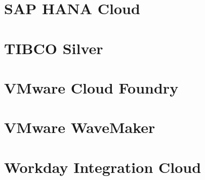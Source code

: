 \section{SAP HANA Cloud}\label{ch:app01:sap}


\newpage
\section{TIBCO Silver}


\newpage
\section{VMware Cloud Foundry}


\section{VMware WaveMaker}


\section{Workday Integration Cloud}

